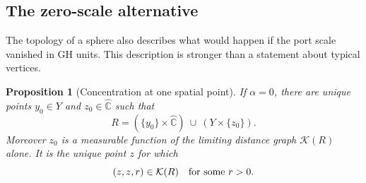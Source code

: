 \documentclass[11pt]{article}
\numberwithin{equation}{section}
\newtheorem{proposition}[theorem]{Proposition}
\theoremstyle{definition}
\theoremstyle{remark}
\newcommand{\1}{\mathbf 1}
\begin{document}
\subsection{The zero-scale alternative}

The topology of a sphere also describes what would happen if the
port scale vanished in GH units.  This description is stronger than
a statement about typical vertices.

\begin{proposition}[Concentration at one spatial point]
\label{comp:concentration}
If $\alpha=0$, there are unique points $y_0\in Y$ and $z_0\in\widehat{\mathbb C}$
such that
\begin{equation}
 \label{comp:cross-relation}
 R=(\{y_0\}\times\widehat{\mathbb C})\ \cup\ (Y\times\{z_0\}).
\end{equation}
Moreover $z_0$ is a measurable function of the limiting distance
graph $\mathcal K(R)$ alone.  It is the unique point $z$ for which
\begin{equation}
 \label{comp:positive-diagonal}
 (z,z,r)\in\mathcal K(R)\quad\hbox{for some }r>0.
\end{equation}
\end{proposition}
\end{document}
